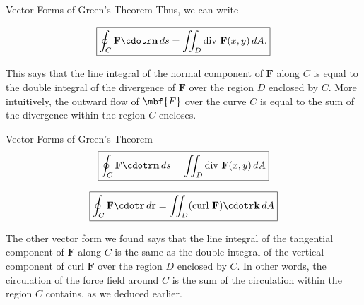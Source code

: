 \documentclass[11pt,english,
handout
]{beamer}
\begin{document}
\begin{frame}[t]{Vector Forms of Green's Theorem}
\small 
Thus, we can write

\[
\boxed{\oint_C\mathbf{F}\cdotr\mathbf{n}\,ds=\iint_D\text{div }\mathbf{F}(x,y)\,dA.}
\]\pause


This says that the line integral of the normal component of $\mathbf{F}$ along $C$ is equal to the double integral of the divergence of $\mathbf{F}$ over the region $D$ enclosed by $C$. \pause More intuitively, the outward flow of $\mbf{F}$ over the curve $C$ is equal to the sum of the divergence within the region $C$ encloses.
\end{frame}















\begin{frame}[t]{Vector Forms of Green's Theorem}
\small 
\[
\boxed{\oint_C\mathbf{F}\cdotr\mathbf{n}\,ds=\iint_D\text{div }\mathbf{F}(x,y)\,dA}
\]

\lspace
\[
\boxed{
\oint_C\mathbf{F}\cdotr\,d\mathbf{r}=\iint_D(\text{curl }\mathbf{F})\cdotr\mathbf{k}\,dA}
\]

The other vector form we found says that the line integral of the tangential component of $\mathbf{F}$ along $C$ is the same as the double integral of the vertical component of curl $\mathbf{F}$ over the region $D$ enclosed by $C$. In other words, the circulation of the force field around $C$ is the sum of the circulation within the region $C$ contains, as we deduced earlier.


\end{frame}
\end{document}
